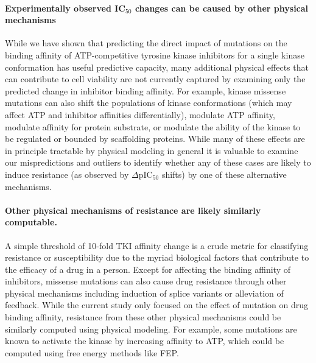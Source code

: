 \documentclass[phd,tocprelim]{cornell}
\begin{document}
\paragraph{Experimentally observed IC$_{50}$ changes can be caused by other physical mechanisms}
While we have shown that predicting the direct impact of mutations on the binding affinity of ATP-competitive tyrosine kinase inhibitors for a single kinase conformation has useful predictive capacity, many additional physical effects that can contribute to cell viability are not currently captured by examining only the predicted change in inhibitor binding affinity.
For example, kinase missense mutations can also shift the populations of kinase conformations (which may affect ATP and inhibitor affinities differentially), modulate ATP affinity, modulate affinity for protein substrate, or modulate the ability of the kinase to be regulated or 
bounded by scaffolding proteins. 
While many of these effects are in principle tractable by physical modeling in general %
it is valuable to examine our mispredictions and outliers to identify whether any of these cases are likely to induce resistance (as observed by $\Delta$pIC$_{50}$ shifts) by one of these alternative mechanisms.


\paragraph{Other physical mechanisms of resistance are likely similarly computable.}
A simple threshold of 10-fold TKI affinity change is a crude metric for classifying resistance or susceptibility due to the myriad biological factors that contribute to the efficacy of a drug in a person. 
Except for affecting the binding affinity of inhibitors, missense mutations can also cause drug resistance through other physical mechanisms including induction of splice variants or alleviation of feedback.
While the current study only focused on the effect of mutation on drug binding affinity, resistance from these other physical mechanisms could be similarly computed using physical modeling.
For example, some mutations are known to activate the kinase by increasing affinity to ATP, which could be computed using free energy methods like FEP. %
\end{document}
